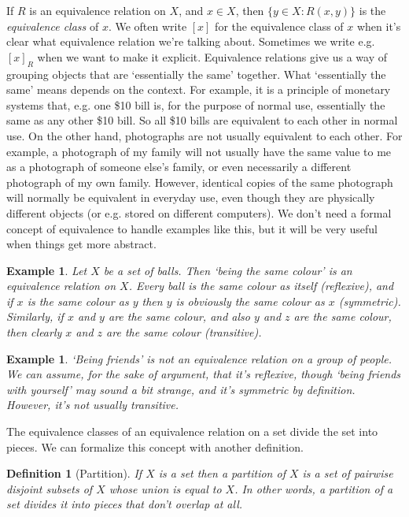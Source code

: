 \documentclass{article}
\theoremstyle{plain}
\newtheorem{definition}[theorem]{Definition}{\bfseries}{\upshape}
\newtheorem{example}[theorem]{Example}{\bfseries}{\upshape}
\begin{document}
If $R$ is an equivalence relation on $X$, and $x\in X$, then $\{y\in X: R(x,y)\}$ is the \emph{equivalence class} of $x$. We often write $[x]$ for the equivalence class of $x$ when it's clear what equivalence relation we're talking about. Sometimes we write e.g. $[x]_R$ when we want to make it explicit. Equivalence relations give us a way of grouping objects that are `essentially the same' together. What `essentially the same' means depends on the context. For example, it is a principle of monetary systems that, e.g. one \$10 bill is, for the purpose of normal use, essentially the same as any other \$10 bill. So all \$10 bills are equivalent to each other in normal use. On the other hand, photographs are not usually equivalent to each other. For example, a photograph of my family will not usually have the same value to me as a photograph of someone else's family, or even necessarily a different photograph of my own family. However, identical copies of the same photograph will normally be equivalent in everyday use, even though they are physically different objects (or e.g. stored on different computers). We don't need a formal concept of equivalence to handle examples like this, but it will be very useful when things get more abstract.      

\begin{example}
Let $X$ be a set of balls. Then `being the same colour' is an equivalence relation on $X$. Every ball is the same colour as itself (reflexive), and if $x$ is the same colour as $y$ then $y$ is obviously the same colour as $x$ (symmetric). Similarly, if $x$ and $y$ are the same colour, and also $y$ and $z$ are the same colour, then clearly $x$ and $z$ are the same colour (transitive).
\end{example}

\begin{example}
`Being friends' is not an equivalence relation on a group of people. We can assume, for the sake of argument, that it's reflexive, though `being friends with yourself' may sound a bit strange, and it's symmetric by definition. However, it's not usually transitive. 
\end{example}

The equivalence classes of an equivalence relation on a set divide the set into pieces. We can formalize this concept with another definition.

\begin{definition}[Partition]
If $X$ is a set then a \emph{partition} of $X$ is a set of pairwise disjoint subsets of $X$ whose union is equal to $X$. In other words, a partition of a set divides it into pieces that don't overlap at all. 
\end{definition}
\end{document}
